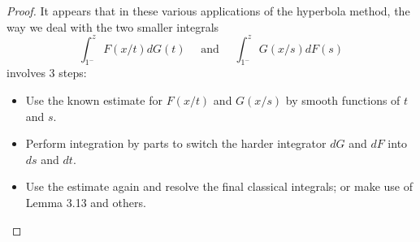 \documentclass[12pt]{article}
\begin{document}
\begin{proof}
It appears that in these various applications of the hyperbola method, the way we deal with the two smaller integrals
$$\int_{1^-}^z F(x/t) dG(t) \quad \text{ and } \quad \int_{1^-}^z G(x/s) dF(s)$$
involves 3 steps:
\begin{itemize}
\item Use the known estimate for $F(x/t)$ and $G(x/s)$ by smooth functions of $t$ and $s$.
\item Perform integration by parts to switch the harder integrator $dG$ and $dF$ into $ds$ and $dt$.
\item Use the estimate again and resolve the final classical integrals; or make use of Lemma 3.13 and others.
\end{itemize}
\end{proof}

\unless\ifdefined\IsMainDocument
\end{document}

